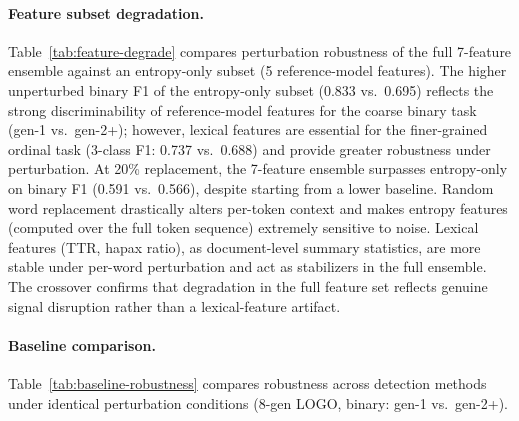 \paragraph{Feature subset degradation.}
Table~\ref{tab:feature-degrade} compares perturbation robustness of the full 7-feature ensemble against an entropy-only subset (5 reference-model features).
The higher unperturbed binary F1 of the entropy-only subset (0.833 vs.\ 0.695) reflects the strong discriminability of reference-model features for the coarse binary task (gen-1 vs.\ gen-2+); however, lexical features are essential for the finer-grained ordinal task (3-class F1: 0.737 vs.\ 0.688) and provide greater robustness under perturbation.
At 20\% replacement, the 7-feature ensemble surpasses entropy-only on binary F1 (0.591 vs.\ 0.566), despite starting from a lower baseline.
Random word replacement drastically alters per-token context and makes entropy features (computed over the full token sequence) extremely sensitive to noise.
Lexical features (TTR, hapax ratio), as document-level summary statistics, are more stable under per-word perturbation and act as stabilizers in the full ensemble.
The crossover confirms that degradation in the full feature set reflects genuine signal disruption rather than a lexical-feature artifact.

\begin{table}[ht]
\centering
\small
\caption{Feature subset degradation under random word replacement (8-gen LOGO). Entropy-only: 5 reference-model features; 7-feature: full ensemble including lexical features.}
\label{tab:feature-degrade}
\end{table}

\paragraph{Baseline comparison.}
Table~\ref{tab:baseline-robustness} compares robustness across detection methods under identical perturbation conditions (8-gen LOGO, binary: gen-1 vs.\ gen-2+).

